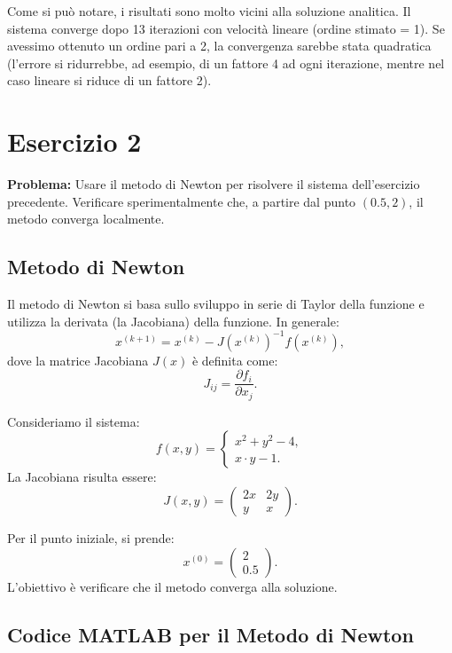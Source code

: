 \documentclass[11pt]{article}
\begin{document}
Come si può notare, i risultati sono molto vicini alla soluzione analitica. Il sistema converge dopo 13 iterazioni con velocità lineare (ordine stimato = 1). Se avessimo ottenuto un ordine pari a 2, la convergenza sarebbe stata quadratica (l'errore si ridurrebbe, ad esempio, di un fattore 4 ad ogni iterazione, mentre nel caso lineare si riduce di un fattore 2).

\section*{Esercizio 2}
\textbf{Problema:} Usare il metodo di Newton per risolvere il sistema dell’esercizio precedente. Verificare sperimentalmente che, a partire dal punto \((0.5,2)\), il metodo converga localmente.

\subsection*{Metodo di Newton}
Il metodo di Newton si basa sullo sviluppo in serie di Taylor della funzione e utilizza la derivata (la Jacobiana) della funzione. In generale:
\[
  x^{(k+1)} = x^{(k)} - J(x^{(k)})^{-1} f(x^{(k)}),
\]
dove la matrice Jacobiana \( J(x) \) è definita come:
\[
	J_{ij} = \frac{\partial f_i}{\partial x_j}.
\]

Consideriamo il sistema:
\[
f(x,y)=
\begin{cases}
	x^2 + y^2 - 4,\\[1mm]
	x \cdot y - 1.
\end{cases}
\]
La Jacobiana risulta essere:
\[
J(x,y)=
\begin{pmatrix}
	2x & 2y\\[1mm]
	y & x
\end{pmatrix}.
\]

Per il punto iniziale, si prende:
\[
x^{(0)} = \begin{pmatrix} 2 \\ 0.5 \end{pmatrix}.
\]
L'obiettivo è verificare che il metodo converga alla soluzione.

\subsection*{Codice MATLAB per il Metodo di Newton}
\end{document}
